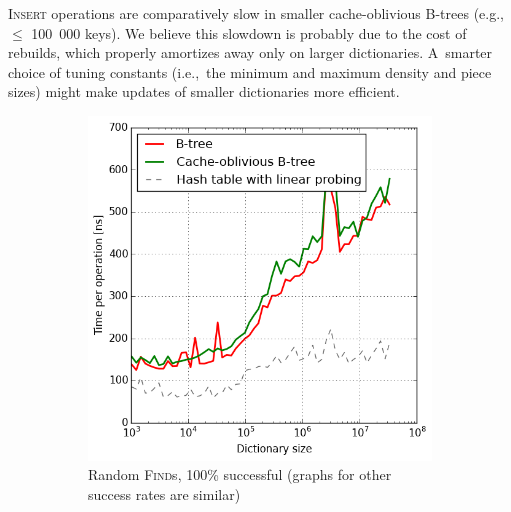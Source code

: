 \textsc{Insert} operations are comparatively slow in smaller cache-oblivious
B-trees (e.g.,\ $\leq$ 100~000 keys). We believe this slowdown is probably due
to the cost of rebuilds, which properly amortizes away only on larger
dictionaries. A~smarter choice of tuning constants (i.e.,\ the minimum and
maximum density and piece sizes) might make updates of smaller dictionaries
more efficient.

\begin{figure}
\centering
\begin{subfigure}[t]{0.45\textwidth}
	\includegraphics[width=\textwidth]{img/performance/cob-performance-1-100}
	\caption{Random \textsc{Find}s, 100\% successful (graphs for
		other success rates are similar)}
\end{subfigure}
~
\begin{subfigure}[t]{0.45\textwidth}

\end{subfigure}
\end{figure}

